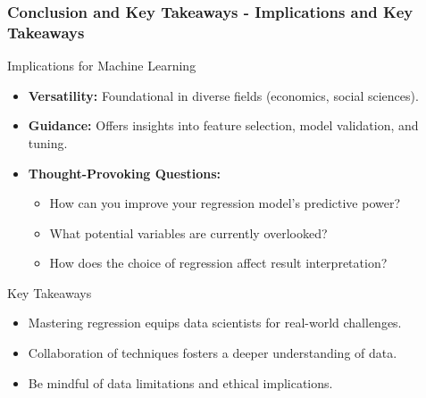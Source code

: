 \documentclass[aspectratio=169]{beamer}
\begin{document}
\begin{frame}[fragile]
    \frametitle{Conclusion and Key Takeaways - Implications and Key Takeaways}

    \begin{block}{Implications for Machine Learning}
        \begin{itemize}
            \item \textbf{Versatility:} Foundational in diverse fields (economics, social sciences).
            \item \textbf{Guidance:} Offers insights into feature selection, model validation, and tuning.
            \item \textbf{Thought-Provoking Questions:}
            \begin{itemize}
                \item How can you improve your regression model's predictive power?
                \item What potential variables are currently overlooked?
                \item How does the choice of regression affect result interpretation?
            \end{itemize}
        \end{itemize}
    \end{block}

    \begin{block}{Key Takeaways}
        \begin{itemize}
            \item Mastering regression equips data scientists for real-world challenges.
            \item Collaboration of techniques fosters a deeper understanding of data.
            \item Be mindful of data limitations and ethical implications.
        \end{itemize}
    \end{block}
\end{frame}
\end{document}
